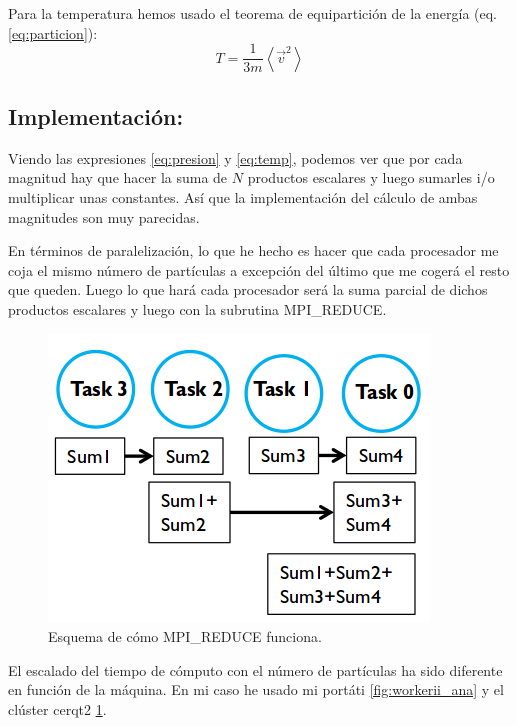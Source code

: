 Para la temperatura hemos usado el teorema de equipartición de la energía (eq. \ref{eq:particion}):
\begin{equation}
T = \frac{1}{3m} \left\langle \vec{v}^2 \right\rangle
\label{eq:temp}
\end{equation}

\subsection{Implementación:}
Viendo las expresiones \ref{eq:presion} y \ref{eq:temp}, podemos ver que por cada magnitud hay que hacer la suma de $N$ productos escalares y luego sumarles i/o multiplicar unas constantes. Así que la implementación del cálculo de ambas magnitudes son muy parecidas.

En términos de paralelización, lo que he hecho es hacer que cada procesador me coja el mismo número de partículas a excepción del último que me cogerá el resto que queden. Luego lo que hará cada procesador será la suma parcial de dichos productos escalares y luego con la subrutina \textsf{MPI\_REDUCE}.
\begin{figure}[H]
\includegraphics[scale=0.50]{reduce.png} 
\caption{Esquema de cómo \textsf{MPI\_REDUCE} funciona.} 
\label{fig:cerqt2_ana}
\end{figure}
El escalado del tiempo de cómputo con el número de partículas ha sido diferente en función de la máquina. En mi caso he usado mi portáti \ref{fig:workerii_ana} y el clúster cerqt2 \ref{fig:cerqt2_ana}.

